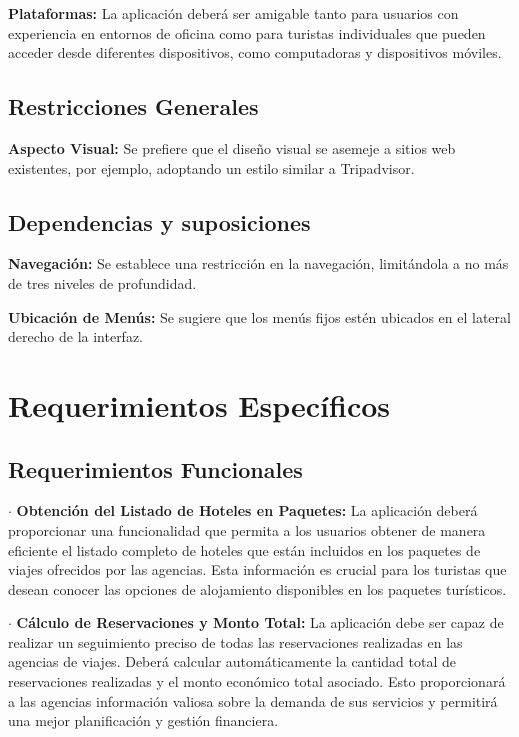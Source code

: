 \documentclass{article}
\begin{document}
    \textbf{Plataformas:}
        La aplicación deberá ser amigable tanto para usuarios con experiencia en entornos de oficina 
        como para turistas individuales que pueden acceder desde diferentes dispositivos, 
        como computadoras y dispositivos móviles.

\subsection{Restricciones Generales}
    \textbf{Aspecto Visual:}
        Se prefiere que el diseño visual se asemeje a sitios web existentes, por ejemplo, adoptando 
        un estilo similar a Tripadvisor.

    
\subsection{Dependencias y suposiciones}
    \textbf{Navegación:}
    Se establece una restricción en la navegación, limitándola a no más de tres niveles de profundidad.

    \textbf{Ubicación de Menús:}
    Se sugiere que los menús fijos estén ubicados en el lateral derecho de la interfaz.


\section{Requerimientos Específicos}
\subsection{Requerimientos Funcionales}
    $\cdot$ \textbf{Obtención del Listado de Hoteles en Paquetes:}
        La aplicación deberá proporcionar una funcionalidad que permita a los usuarios 
        obtener de manera eficiente el listado completo de hoteles que están incluidos 
        en los paquetes de viajes ofrecidos por las agencias. Esta información es crucial 
        para los turistas que desean conocer las opciones de alojamiento disponibles en los 
        paquetes turísticos.

     $\cdot$ \textbf{Cálculo de Reservaciones y Monto Total:}
        La aplicación debe ser capaz de realizar un seguimiento preciso de todas las reservaciones 
        realizadas en las agencias de viajes. Deberá calcular automáticamente la cantidad total de 
        reservaciones realizadas y el monto económico total asociado. Esto proporcionará a las agencias
         información valiosa sobre la demanda de sus servicios y permitirá una mejor planificación y 
         gestión financiera.
\end{document}
